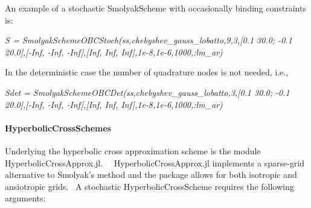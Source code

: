 \documentclass[notitlepage,11pt]{article}
\begin{document}
\bigskip

An example of a stochastic SmolyakScheme with occasionally binding
constraints is:

\bigskip

\textit{S = SmolyakSchemeOBCStoch(ss,chebyshev\_gauss\_lobatto,9,3,[0.1
30.0; -0.1 20.0],[-Inf, -Inf, -Inf],[Inf, Inf, Inf],1e-8,1e-6,1000,:lm\_ar)}

\bigskip

In the deterministic case the number of quadrature nodes is not needed, i.e.,

\bigskip

\textit{Sdet = SmolyakSchemeOBCDet(ss,chebyshev\_gauss\_lobatto,3,[0.1 30.0;
-0.1 20.0],[-Inf, -Inf, -Inf],[Inf, Inf, Inf],1e-8,1e-6,1000,:lm\_ar)}

\paragraph{HyperbolicCrossSchemes}

Underlying the hyperbolic cross approximation scheme is the module
HyperbolicCrossApprox.jl. \ \ HyperbolicCrossApprox.jl implements a
sparse-grid alternative to Smolyak's method and the package allows for both
isotropic and ansiotropic grids. \ A stochastic HyperbolicCrossScheme
requires the following arguments:
\end{document}
